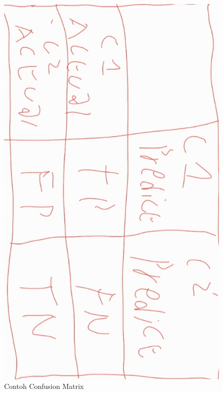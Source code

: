 \begin{enumerate}
\begin{figure}[H]
    \centering
    \includegraphics[scale=0.2]{figures/1174035/chapter3/confusion.jpeg}
    \caption{Contoh Confusion Matrix}
    \label{contoh}
\end{figure}



\end{enumerate}
